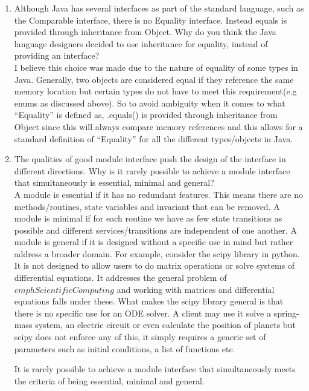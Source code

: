 \documentclass[12pt]{article}
\begin{document}
\begin{enumerate}
  
\item Although Java has several interfaces as part of the standard language,
  such as the Comparable interface, there is no Equality interface.  Instead
  equals is provided through inheritance from Object.  Why do you think the
  Java language designers decided to use inheritance for equality, instead of
  providing an interface?\\
  
  I believe this choice was made due to the nature of equality of some types in Java. Generally, two objects are considered equal if they reference the same memory location but certain types do not have to meet this requirement(e.g enums as discussed above). So to avoid ambiguity when it comes to what ``Equality'' is defined as, .equals() is provided through inheritance from Object since this will always compare memory references and this allows for a standard definition of ``Equality'' for all the different types/objects in Java.
  
\item The qualities of good module interface push the design of the interface in
  different directions. Why is it rarely possible to achieve a module interface
  that simultaneously is essential, minimal and general?\\
  
  A module is essential if it has no redundant features. This means there are no methods/routines, state variables and invariant that can be removed. A module is minimal if for each routine we have as few state transitions as possible and different services/transitions are independent of one another. A module is general if it is designed without a specific use in mind but rather address a broader domain. For example, consider the scipy library in python. It is not designed to allow users to do matrix operations or solve systems of differential equations. It addresses the general problem of $emph{Scientific Computing}$ and working with matrices and differential equations falls under these. What makes the scipy library general is that there is no specific use for an ODE solver. A client may use it solve a spring-mass system, an electric circuit or even calculate the position of planets but scipy does not enforce any of this, it simply requires a generic set of parameters such as initial conditions, a list of functions etc. 
  
  It is rarely possible to achieve a module interface that simultaneously meets the criteria of being essential, minimal and general.
  
  
\end{enumerate}
\end{document}
